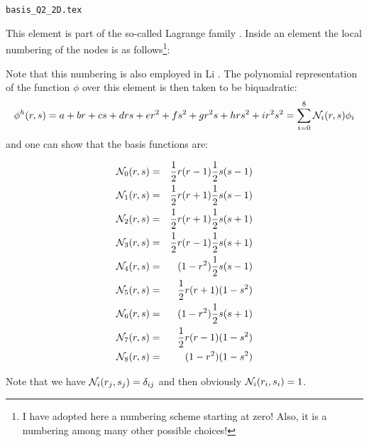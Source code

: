 \begin{flushright} {\tiny {\color{gray} \tt basis\_Q2\_2D.tex}} \end{flushright}

This element is part of the so-called Lagrange family \cite{raki00}. 
Inside an element the local numbering of the nodes is as follows\footnote{I have adopted here 
a numbering scheme starting at zero! Also, it is a numbering among many other possible choices!}:



Note that this numbering is also employed in Li \cite[p56]{li06}.
The polynomial representation of the function $\phi$ over this element is then taken to be biquadratic:
\[
\phi^h(r,s) = a + br + cs + drs + er^2 + fs^2 + gr^2s + hrs^2 + i r^2s^2 = \sum_{i=0}^8 {\mathcal{N}}_i(r,s) \phi_i
\]
and one can show that the basis functions are:
\begin{mdframed}[backgroundcolor=blue!5]
\begin{eqnarray}
{\mathcal{N}}_0(r,s)&=& \frac{1}{2}r(r-1)  \frac{1}{2}s(s-1)\nonumber\\
{\mathcal{N}}_1(r,s)&=& \frac{1}{2}r(r+1)  \frac{1}{2}s(s-1)\nonumber\\
{\mathcal{N}}_2(r,s)&=& \frac{1}{2}r(r+1)  \frac{1}{2}s(s+1)\nonumber\\
{\mathcal{N}}_3(r,s)&=& \frac{1}{2}r(r-1)  \frac{1}{2}s(s+1)\nonumber\\
{\mathcal{N}}_4(r,s)&=&     (1-r^2)  \frac{1}{2}s(s-1)\nonumber\\
{\mathcal{N}}_5(r,s)&=& \frac{1}{2}r(r+1)      (1-s^2)\nonumber\\
{\mathcal{N}}_6(r,s)&=&     (1-r^2)  \frac{1}{2}s(s+1)\nonumber\\
{\mathcal{N}}_7(r,s)&=& \frac{1}{2}r(r-1)      (1-s^2)\nonumber\\
{\mathcal{N}}_8(r,s)&=&     (1-r^2)      (1-s^2)\nonumber
\end{eqnarray}
\end{mdframed}
Note that we have ${\mathcal{N}}_i(r_j,s_j)=\delta_{ij}$ and then obviously ${\mathcal{N}}_i(r_i,s_i)=1$. 

